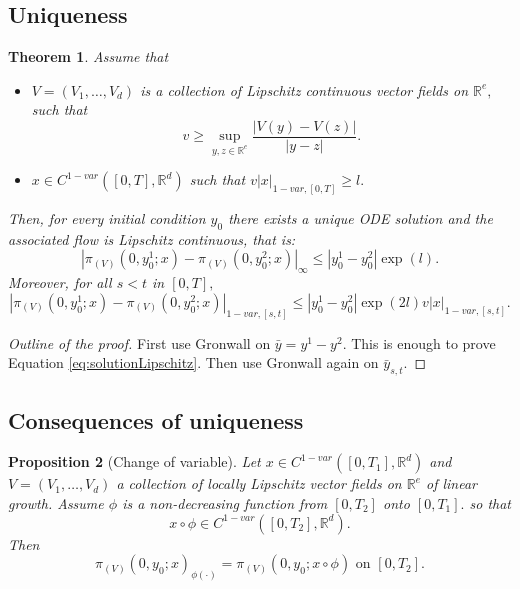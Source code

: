 \documentclass{article}
\newcommand{\R}{\mathbb{R}}
\newtheorem{theorem}{Theorem}
\newtheorem{prop}[theorem]{Proposition}
\begin{document}
\subsection{Uniqueness}

\begin{theorem}
    Assume that 
    \begin{itemize}
        \item $V = (V_1, \ldots, V_d)$ is a collection of Lipschitz continuous vector fields on $\R^e,$ such that
        \begin{equation}
            v \geq \sup_{y,z \in \R^e} \frac{|V(y) - V(z)|}{|y - z|}.
        \end{equation}
        \item $x \in C^{1-var}([0,T],\R^d)$ such that $v |x|_{1-var,[0,T]} \geq l.$
    \end{itemize}
    Then, for every initial condition $y_0$ there exists a unique ODE solution and the associated flow is Lipschitz continuous, that is:
    \begin{equation}\label{eq:solutionLipschitz}
         |\pi_{(V)}(0, y^1_0; x) - \pi_{(V)}(0, y^2_0; x)|_\infty \leq |y^1_0 - y^2_0| \exp(l).
    \end{equation}
    Moreover, for all $s < t$ in $[0,T],$
    \begin{equation}
        |\pi_{(V)}(0, y^1_0; x) - \pi_{(V)}(0, y^2_0; x)|_{1-var,[s,t]} \leq |y^1_0 - y^2_0| \exp(2l) v |x|_{1-var,[s,t]}.
    \end{equation}
\end{theorem}
\begin{proof}[Outline of the proof]
    First use Gronwall on $\bar{y} = y^1 - y^2.$ This is enough to prove Equation \eqref{eq:solutionLipschitz}.
    Then use Gronwall again on $\bar{y}_{s,t}.$
\end{proof}

\subsection{Consequences of uniqueness}
\begin{prop}[Change of variable]
    Let $x \in C^{1-var}([0,T_1], \R^d)$ and $V = (V_1, \ldots, V_d)$ a collection of locally Lipschitz vector fields on $\R^e$ of linear growth.
    Assume $\phi$ is a non-decreasing function from $[0,T_2]$ onto $[0,T_1].$ so that
\begin{equation}
    x \circ \phi \in C^{1-var}([0,T_2], \R^d).
\end{equation}
Then 
\begin{equation}
    \pi_{(V)}(0, y_0; x)_{\phi(\cdot)} = \pi_{(V)}(0, y_0; x \circ \phi) \text{ on } [0,T_2].
\end{equation}
\end{prop}
\end{document}
